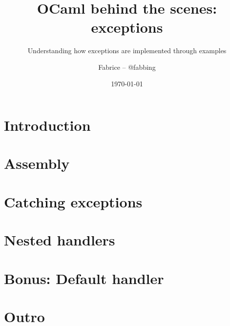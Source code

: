 \documentclass[aspectratio=169,usenames,dvipsnames,8pt,compress]{beamer}
\title[OBTS: exceptions]{OCaml behind the scenes: exceptions}
\subtitle{Understanding how exceptions are implemented through examples}
\author{Fabrice -- @fabbing}
\institute{Tarides}
\date{\today}
\begin{document}
\newcommand{\funcname}[1]{%
\texttt{\textcolor{RoyalBlue}{#1}}%
}

\newcommand{\funcarg}[1]{%
\texttt{\textcolor{Periwinkle}{#1}}%
}

\newcommand{\localname}[1]{%
\texttt{\textcolor{Periwinkle}{#1}}%
}

\newcommand{\typename}[1]{%
\texttt{\textcolor{BrickRed}{#1}}%
}

\newcommand{\regname}[1]{%
  \texttt{\textcolor{Periwinkle}{$\langle$#1$\rangle$}}%
}





\newcommand\frameSubsection[2]{
\begin{frame}
\vfill
\centering
\begin{beamercolorbox}[sep=8pt,center,shadow=true,rounded=true]{title}
  \usebeamerfont{title}\insertsectionhead\par%
  \smallskip
  \usebeamerfont{subtitle}\insertsubsectionhead\par%
\end{beamercolorbox}
\ifthenelse{\equal{#1}{}}{}{
  \smallskip
  \begin{figure}
    \texttt{[image: \#1]}
    \ifthenelse{\equal{#2}{}}{}{
      \caption*{#2}
    }
  \end{figure}
}
\vfill
\end{frame}
}

\newcommand\frameSubsectionTakeaway{%
\frameSubsection{pictures/Trinity.png}{}%
}


\begin{frame}
  \titlepage
\end{frame}

\section*{Introduction}


\section{Assembly}


\section{Catching exceptions}


\section{Nested handlers}


\section{Bonus: Default handler}


\section*{Outro}



%

\end{document}
